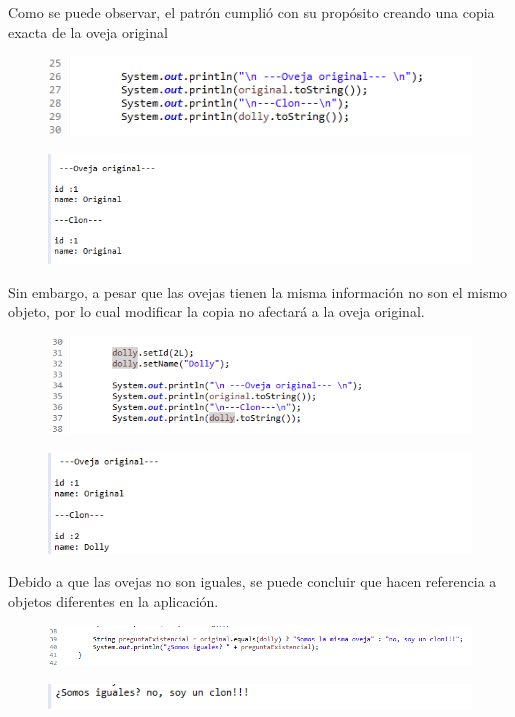 Como se puede observar, el patrón cumplió con su propósito creando una copia exacta de la oveja original

\begin{figure}[H]
	\includegraphics{images/creational/prototipe/prorotypeExample5.png}
\end{figure}

\begin{figure}[H]
	\includegraphics{images/creational/prototipe/prorotypeExample6.png}
\end{figure}

Sin embargo, a pesar que las ovejas tienen la misma información  no son el mismo objeto, por lo cual modificar la copia no afectará a la oveja original.

\begin{figure}[H]
	\includegraphics{images/creational/prototipe/prorotypeExample7.png}
\end{figure}

\begin{figure}[H]
	\includegraphics{images/creational/prototipe/prorotypeExample8.png}
\end{figure}

Debido a que las ovejas no son iguales, se puede concluir que hacen referencia a objetos diferentes en la aplicación.

\begin{figure}[H]
	\includegraphics{images/creational/prototipe/prorotypeExample9.png}
\end{figure}

\begin{figure}[H]
	\includegraphics{images/creational/prototipe/prorotypeExample10.png}
\end{figure}
